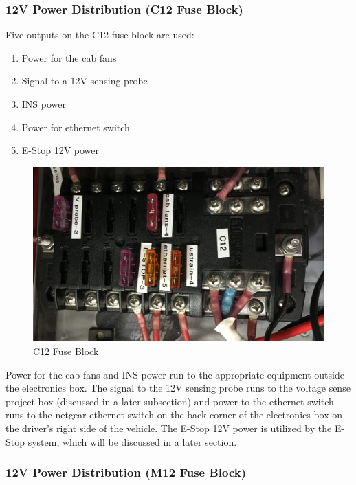 \subsubsection{12V Power Distribution (C12 Fuse Block)}

\begin{minipage}{0.6\textwidth}
Five outputs on the C12 fuse block are used:
\begin{enumerate}
\item Power for the cab fans
\item Signal to a 12V sensing probe
\item INS power
\item Power for ethernet switch
\item E-Stop 12V power
\end{enumerate}
\end{minipage} \hfill
\begin{minipage}{0.5\textwidth}
\begin{figure}[H]
\centering
\includegraphics[scale=.06, angle=90]{Photos/C12.jpg}
\caption{\label{fig:C12} C12 Fuse Block}
\end{figure}
\end{minipage}

\bigskip

\noindent Power for the cab fans and INS power run to the appropriate equipment outside the electronics box. The signal to the 12V sensing probe runs to the voltage sense project box (discussed in a later subsection) and power to the ethernet switch runs to the netgear ethernet switch on the back corner of the electronics box on the driver's right side of the vehicle. The E-Stop 12V power is utilized by the E-Stop system, which will be discussed in a later section.

\subsubsection{12V Power Distribution (M12 Fuse Block)}

